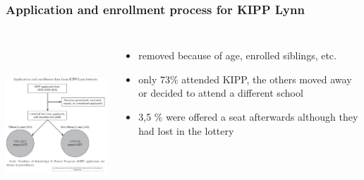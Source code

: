 \documentclass{beamer}
\begin{document}
\begin{frame}
\frametitle{Application and enrollment process for KIPP Lynn}

\begin{columns}
\includegraphics[width=6.5cm,height=6.5cm,keepaspectratio]{Figure 3.1} 

\begin{itemize}
	\item removed because of age, enrolled siblings, etc.
	\item only 73\% attended KIPP, the others moved away or decided to attend a different school
	\item 3,5 \% were offered a seat afterwards although they had lost in the lottery
\end{itemize}

\end{columns}
\end{frame}
\end{document}
